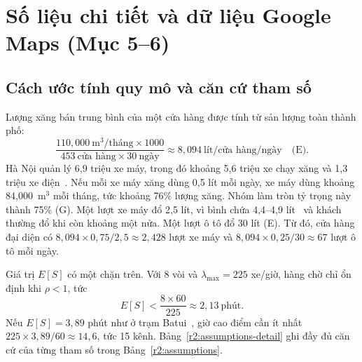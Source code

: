 
\section{Số liệu chi tiết và dữ liệu Google Maps (Mục 5--6)}
\label{r2:appendix}

\subsection{Cách ước tính quy mô và căn cứ tham số}
\label{r2:app-params}
\noindent
Lượng xăng bán trung bình của một cửa hàng được tính từ sản lượng toàn thành phố:
\begin{equation}
\frac{110,000\ \text{m}^3/\text{tháng}\times1000}{453\ \text{cửa hàng}\times30\ \text{ngày}}
\approx 8,094\ \text{lít/cửa hàng/ngày}\quad\text{(E)}.
\end{equation}
Hà Nội quản lý 6,9 triệu xe máy, trong đó khoảng 5,6 triệu xe chạy xăng và 1,3 triệu xe điện~\cite{vnex2025}. Nếu mỗi xe máy xăng dùng 0,5 lít mỗi ngày, xe máy dùng khoảng 84,000~m$^3$ mỗi tháng, tức khoảng 76\% lượng xăng. Nhóm
làm tròn tỷ trọng này thành 75\% (G). Một lượt xe máy đổ 2,5 lít, vì bình chứa
4,4--4,9 lít~\cite{tank} và khách thường đổ khi còn khoảng một nửa. Một lượt ô
tô đổ 30 lít (E). Từ đó, cửa hàng đại diện có
$8{,}094\times0{,}75/2{,}5\approx2{,}428$ lượt xe máy và
$8{,}094\times0{,}25/30\approx67$ lượt ô tô mỗi ngày.

Giá trị $E[S]$ có một chặn trên. Với 8 vòi và $\lambda_{\max}=225$ xe/giờ,
hàng chờ chỉ ổn định khi $\rho<1$, tức
\begin{equation}
E[S]<\frac{8\times60}{225}\approx2{,}13\ \text{phút}.
\end{equation}
Nếu $E[S]=3{,}89$ phút như ở trạm Batui~\cite{batui}, giờ cao điểm cần ít
nhất $225\times3{,}89/60\approx14{,}6$, tức 15 kênh. Bảng~\ref{r2:assumptions-detail}
ghi đầy đủ căn cứ của từng tham số trong Bảng~\ref{r2:assumptions}.

